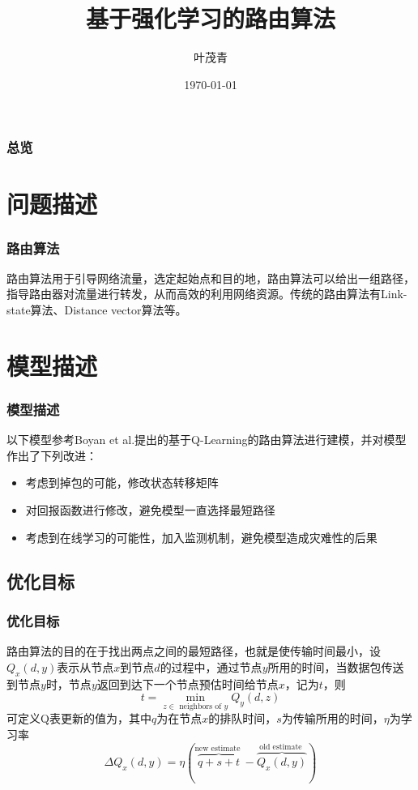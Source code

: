 \documentclass[hyperref={pdfpagelabels=false}]{beamer}
\title{基于强化学习的路由算法}
\author{叶茂青}
\date{\today}
\begin{document}
\begin{frame}
\titlepage
\end{frame} 

\begin{frame}
	\frametitle{总览}
	\tableofcontents
\end{frame} 

\section{问题描述}

\begin{frame}
	\frametitle{路由算法}
	路由算法用于引导网络流量，选定起始点和目的地，路由算法可以给出一组路径，指导路由器对流量进行转发，从而高效的利用网络资源。传统的路由算法有Link-state算法、Distance vector算法等。
\end{frame}


\section{模型描述}

\begin{frame}
	\frametitle{模型描述}
	以下模型参考Boyan et al.\cite{boyan1994packet}提出的基于Q-Learning的路由算法进行建模，并对模型作出了下列改进：
	\begin{itemize}
		\item 考虑到掉包的可能，修改状态转移矩阵
		\item 对回报函数进行修改，避免模型一直选择最短路径
		\item 考虑到在线学习的可能性，加入监测机制，避免模型造成灾难性的后果
	\end{itemize}

\end{frame}

\subsection{优化目标}
\begin{frame}
	\frametitle{优化目标}
	路由算法的目的在于找出两点之间的最短路径，也就是使传输时间最小，设$Q_x(d,y)$表示从节点$x$到节点$d$的过程中，通过节点$y$所用的时间，当数据包传送到节点$y$时，节点$y$返回到达下一个节点预估时间给节点$x$，记为$t$，则
	\[
		t=\min _{z \in \text { neighbors of } y} Q_{y}(d, z)
	\]
	可定义Q表更新的值为，其中$q$为在节点$x$的排队时间，$s$为传输所用的时间，$\eta$为学习率
	\[
		\Delta Q_{x}(d, y)=\eta(\overbrace{q+s+t}^{\text {new estimate }}-\overbrace{Q_{x}(d, y)}^{\text {old estimate }})
	\]
\end{frame}
\end{document}
